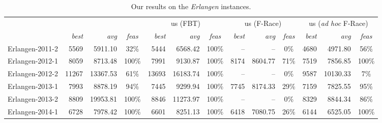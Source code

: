 \documentclass[authoryear,12pt]{article}
\begin{document}
{\begin{table}[htdp]
\begin{scriptsize}
\begin{center}
\begin{tabular}{l|rr|rr}
    \end{tabular}
    \end{center}
    \end{scriptsize}
    \label{tab:results-test-avg}
    \end{table}%
    }


{
    \renewcommand{\arraystretch}{1.1}
       \renewcommand{\tabcolsep}{4pt}

    \begin{table}[htdp]
    \caption{Our results on the \emph{Erlangen} instances.}
    \begin{scriptsize}
    \begin{center}
    \begin{tabular}{l|rrc|rrc|rrc|rrc}

    \toprule
                        & \multicolumn{3}{c|}{\citet{Mull09}}   & \multicolumn{3}{c|}{us (FBT)}   & \multicolumn{3}{c}{us (F-Race)}   & \multicolumn{3}{c}{us (\emph{ad hoc} F-Race)}  \\
                                & \emph{best} & \emph{avg}      & \emph{feas}   & \emph{best} & \emph{avg}      & \emph{feas}    & \emph{best} & \emph{avg}          & \emph{feas}     & \emph{best} & \emph{avg}          & \emph{feas}             \\
    \midrule

Erlangen-2011-2 & 5569 & 5911.10 & 32\% & 5444 & 6568.42 & 100\% & -- & -- & 0\% & 4680 & 4971.80 & 56\% \\
Erlangen-2012-1 & 8059 & 8713.48 & 100\% & 7991 & 9130.87 & 100\% & 8174 & 8604.77 & 71\% & 7519 & 7856.85 & 100\% \\
Erlangen-2012-2 & 11267 & 13367.53 & 61\% & 13693 & 16183.74 & 100\% & -- & -- & 0\% & 9587 & 10130.33 & 7\% \\
Erlangen-2013-1 & 7993 & 8878.19 & 94\% & 7445 & 9299.94 & 100\% & 7745 & 8174.33 & 29\% & 7159 & 7825.55 & 95\% \\
Erlangen-2013-2 & 8809 & 19953.81 & 100\% & 8846 & 11273.97 & 100\% & -- & -- & 0\% & 8329 & 8844.34 & 86\% \\
Erlangen-2014-1 & 6728 & 7978.42 & 100\% & 6601 & 8251.13 & 100\% & 6418 & 7080.75 & 26\% & 6144 & 6525.05 & 100\% \\


\bottomrule
   \end{tabular}
    \end{center}
    \end{scriptsize}
    \label{tab:results-erlangen}
    \end{table}%
}
\end{document}
